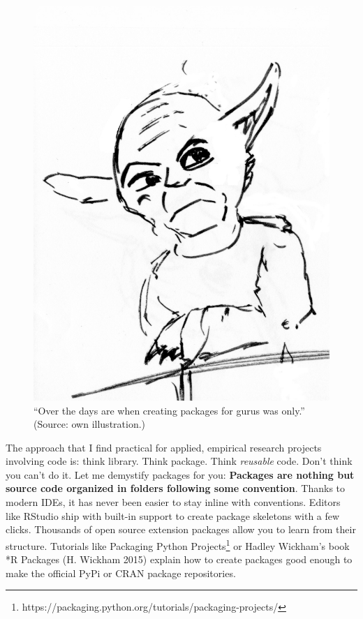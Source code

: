 \documentclass[
  12pt,
  letterpaper,
]{krantz}
\begin{document}
\begin{figure}

{\centering \includegraphics{./images/packages.jpg}

}

\caption{``Over the days are when creating packages for gurus was
only.'' (Source: own illustration.)}

\end{figure}

The approach that I find practical for applied, empirical research
projects involving code is: think library. Think package. Think
\emph{reusable} code. Don't think you can't do it. Let me demystify
packages for you: \textbf{Packages are nothing but source code organized
in folders following some convention}. Thanks to modern IDEs, it has
never been easier to stay inline with conventions. Editors like RStudio
ship with built-in support to create package skeletons with a few
clicks. Thousands of open source extension packages allow you to learn
from their structure. Tutorials like Packaging Python
Projects\footnote{https://packaging.python.org/tutorials/packaging-projects/}
or Hadley Wickham's book *R Packages (H. Wickham 2015) explain how to
create packages good enough to make the official PyPi or CRAN package
repositories.
\end{document}
